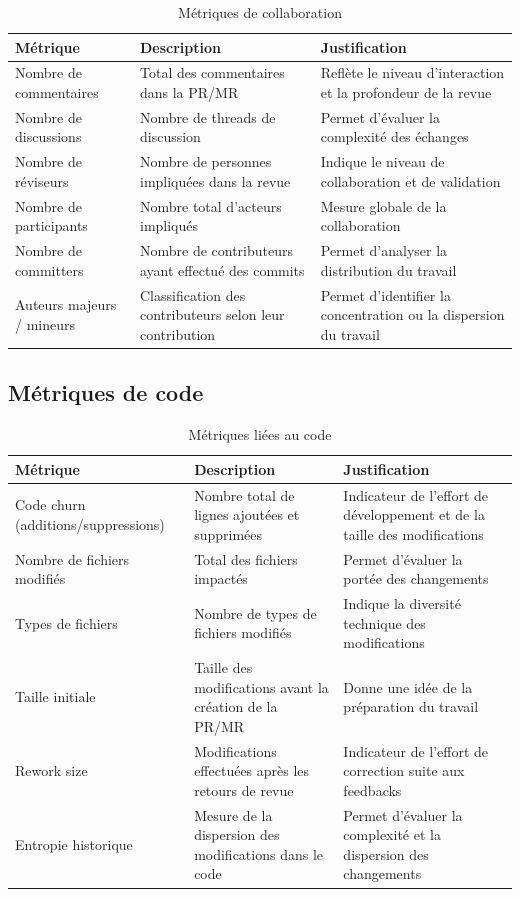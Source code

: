 \begin{table}[H]
\centering
\begin{tabular}{|l|p{5cm}|p{6cm}|}
\hline
\textbf{Métrique} & \textbf{Description} & \textbf{Justification} \\
\hline
Nombre de commentaires & Total des commentaires dans la PR/MR & Reflète le niveau d’interaction et la profondeur de la revue \\
\hline
Nombre de discussions & Nombre de threads de discussion & Permet d’évaluer la complexité des échanges \\
\hline
Nombre de réviseurs & Nombre de personnes impliquées dans la revue & Indique le niveau de collaboration et de validation \\
\hline
Nombre de participants & Nombre total d’acteurs impliqués & Mesure globale de la collaboration \\
\hline
Nombre de committers & Nombre de contributeurs ayant effectué des commits & Permet d’analyser la distribution du travail \\
\hline
Auteurs majeurs / mineurs & Classification des contributeurs selon leur contribution & Permet d’identifier la concentration ou la dispersion du travail \\
\hline
\end{tabular}
\caption{Métriques de collaboration}
\end{table}

\subsection{Métriques de code}

\begin{table}[H]
\centering
\begin{tabular}{|p{4cm}|p{5cm}|p{6cm}|}
\hline
\textbf{Métrique} & \textbf{Description} & \textbf{Justification} \\
\hline
Code churn (additions/suppressions) & Nombre total de lignes ajoutées et supprimées & Indicateur de l’effort de développement et de la taille des modifications \\
\hline
Nombre de fichiers modifiés & Total des fichiers impactés & Permet d’évaluer la portée des changements \\
\hline
Types de fichiers & Nombre de types de fichiers modifiés & Indique la diversité technique des modifications \\
\hline
Taille initiale & Taille des modifications avant la création de la PR/MR & Donne une idée de la préparation du travail \\
\hline
Rework size & Modifications effectuées après les retours de revue & Indicateur de l’effort de correction suite aux feedbacks \\
\hline
Entropie historique & Mesure de la dispersion des modifications dans le code & Permet d’évaluer la complexité et la dispersion des changements \\
\hline
\end{tabular}
\caption{Métriques liées au code}
\end{table}

